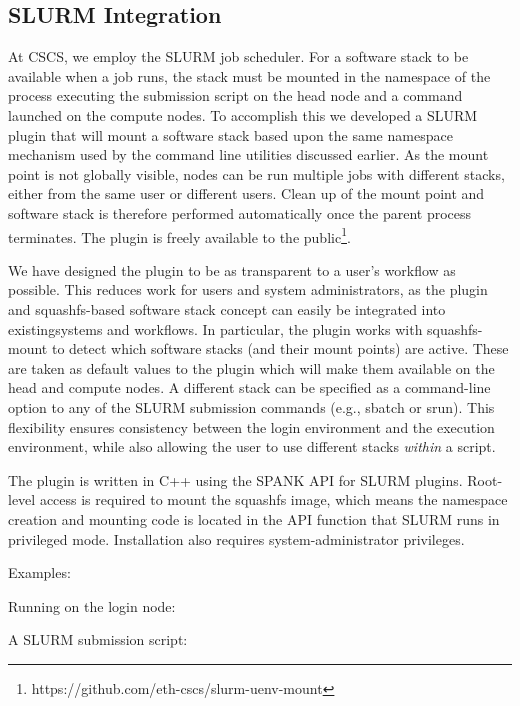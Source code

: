 \subsection{SLURM Integration}


At CSCS, we employ the SLURM job scheduler.
For a software stack to be available when a job runs, the stack must be mounted in the namespace of the process executing the submission script on the head node and a command launched on the compute nodes.
To accomplish this we developed a SLURM plugin that will mount a software stack based upon the same namespace mechanism used by the command line utilities discussed earlier.
As the mount point is not globally visible, nodes can be run multiple jobs with different stacks, either from the same user or different users.
Clean up of the mount point and software stack is therefore performed automatically once the parent process terminates.
The plugin is freely available to the public\footnote{https://github.com/eth-cscs/slurm-uenv-mount}.

We have designed the plugin to be as transparent to a user's workflow as possible.
This reduces work for users and system administrators, as the plugin and squashfs-based software stack concept can easily be integrated into existingsystems and workflows.
In particular, the plugin works with squashfs-mount to detect which software stacks (and their mount points) are active.
These are taken as default values to the plugin which will make them available on the head and compute nodes.
A different stack can be specified as a command-line option to any of the SLURM submission commands (e.g., sbatch or srun).
This flexibility ensures consistency between the login environment and the execution environment, while also allowing the user to use different stacks \emph{within} a script.

The plugin is written in C++ using the SPANK API for SLURM plugins.
Root-level access is required to mount the squashfs image, which means the namespace creation and mounting code is located in the API function that SLURM runs in privileged mode.
Installation also requires system-administrator privileges.

Examples:

Running on the login node:


A SLURM submission script:


